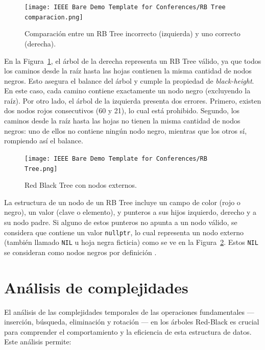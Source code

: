 \documentclass[conference]{IEEEtran}
\begin{document}
\begin{figure}[h]
    \centering
    \texttt{[image: IEEE Bare Demo Template for Conferences/RB Tree comparacion.png]}
    \caption{Comparación entre un RB Tree incorrecto (izquierda) y uno correcto (derecha).}
    \label{fig:rb_incorrect_correct}
\end{figure}

En la Figura~\ref{fig:rb_incorrect_correct}, el árbol de la derecha representa un RB Tree válido, ya que todos los caminos desde la raíz hasta las hojas contienen la misma cantidad de nodos negros. Esto asegura el balance del árbol y cumple  la propiedad de \textit{black-height}. En este caso, cada camino contiene exactamente un nodo negro (excluyendo la raíz). Por otro lado, el árbol de la izquierda presenta dos errores. Primero, existen dos nodos rojos consecutivos (60 y 21), lo cual está prohibido. Segundo, los caminos desde la raíz hasta las hojas no tienen la misma cantidad de nodos negros: uno de ellos no contiene ningún nodo negro, mientras que los otros sí, rompiendo así el balance. \\

\begin{figure}[h]
    \centering
    \texttt{[image: IEEE Bare Demo Template for Conferences/RB Tree.png]}
    \caption{Red Black Tree con nodos externos.}
    \label{fig:rb_nil}
\end{figure}

La estructura de un nodo de un RB Tree incluye un campo de color (rojo o negro), un valor (clave o elemento), y punteros a sus hijos izquierdo, derecho y a su nodo padre. Si alguno de estos punteros no apunta a un nodo válido, se considera que contiene un valor \texttt{nullptr}, lo cual representa un nodo externo (también llamado \texttt{NIL} u hoja negra ficticia) como se ve en la Figura~\ref{fig:rb_nil}. Estos \texttt{NIL} se consideran como nodos negros por definición \cite{cormen2001}. \\




\section{Análisis de complejidades}
El análisis de las complejidades temporales de las operaciones fundamentales --- inserción, búsqueda, eliminación y rotación --- en los árboles Red-Black es crucial para comprender el comportamiento y la eficiencia de esta estructura de datos. Este análisis permite:\\
\end{document}
